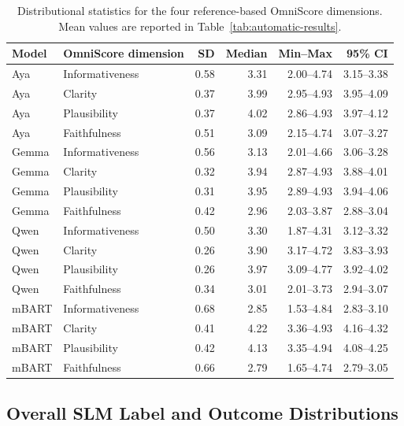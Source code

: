 \documentclass[11pt]{article}
\begin{document}
\begin{table}[t]
\centering
\scriptsize
\setlength{\tabcolsep}{5pt}
\begin{tabular}{llrrrr}
\hline
Model & OmniScore dimension & SD & Median & Min--Max & 95\% CI \\
\hline
Aya   & Informativeness & 0.58 & 3.31 & 2.00--4.74 & 3.15--3.38 \\
Aya   & Clarity         & 0.37 & 3.99 & 2.95--4.93 & 3.95--4.09 \\
Aya   & Plausibility    & 0.37 & 4.02 & 2.86--4.93 & 3.97--4.12 \\
Aya   & Faithfulness    & 0.51 & 3.09 & 2.15--4.74 & 3.07--3.27 \\
Gemma & Informativeness & 0.56 & 3.13 & 2.01--4.66 & 3.06--3.28 \\
Gemma & Clarity         & 0.32 & 3.94 & 2.87--4.93 & 3.88--4.01 \\
Gemma & Plausibility    & 0.31 & 3.95 & 2.89--4.93 & 3.94--4.06 \\
Gemma & Faithfulness    & 0.42 & 2.96 & 2.03--3.87 & 2.88--3.04 \\
Qwen  & Informativeness & 0.50 & 3.30 & 1.87--4.31 & 3.12--3.32 \\
Qwen  & Clarity         & 0.26 & 3.90 & 3.17--4.72 & 3.83--3.93 \\
Qwen  & Plausibility    & 0.26 & 3.97 & 3.09--4.77 & 3.92--4.02 \\
Qwen  & Faithfulness    & 0.34 & 3.01 & 2.01--3.73 & 2.94--3.07 \\
mBART & Informativeness & 0.68 & 2.85 & 1.53--4.84 & 2.83--3.10 \\
mBART & Clarity         & 0.41 & 4.22 & 3.36--4.93 & 4.16--4.32 \\
mBART & Plausibility    & 0.42 & 4.13 & 3.35--4.94 & 4.08--4.25 \\
mBART & Faithfulness    & 0.66 & 2.79 & 1.65--4.74 & 2.79--3.05 \\
\hline
\end{tabular}
\caption{Distributional statistics for the four reference-based OmniScore dimensions. Mean values are reported in Table~\ref{tab:automatic-results}.}
\label{tab:omniscore-distributions}
\end{table}

\subsection{Overall SLM Label and Outcome Distributions}
\label{sec:appendix-overall-taxonomy}
\end{document}
